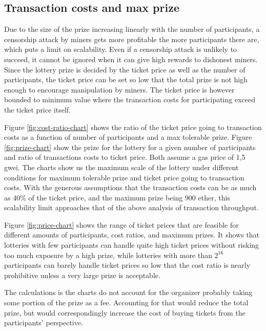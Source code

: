 \subsection{Transaction costs and max prize}

Due to the size of the prize increasing linearly with the number of participants, a censorship attack by miners gets more profitable the more participants there are, which puts a limit on scalability. Even if a censorship attack is unlikely to succeed, it cannot be ignored when it can give high rewards to dishonest miners. Since the lottery prize is decided by the ticket price as well as the number of participants, the ticket price can be set so low that the total prize is not high enough to encourage manipulation by miners. The ticket price is however bounded to minimum value where the transaction costs for participating exceed the ticket price itself.

Figure \ref{fig:cost-ratio-chart} shows the ratio of the ticket price going to transaction costs as a function of number of participants and a max tolerable prize. Figure \ref{fig:prize-chart} show the prize for the lottery for a given number of participants and ratio of transactions costs to ticket price. Both assume a gas price of 1,5 gwei.
The charts show us the maximum scale of the lottery under different conditions for maximum tolerable prize and ticket price going to transaction costs. With the generous assumptions that the transaction costs can be as much as 40\% of the ticket price, and the maximum prize being 900 ether, this scalability limit approaches that of the above analysis of transaction throughput.

Figure \ref{fig:price-chart} shows the range of ticket prices that are feasible for different amounts of participants, cost ratios, and maximum prizes. It shows that lotteries with few participants can handle quite high ticket prices without risking too much exposure by a high prize, while lotteries with more than $2^{16}$ participants can barely handle ticket prices so low that the cost ratio is nearly prohibitive unless a very large prize is acceptable. 

The calculations is the charts do not account for the organizer probably taking some portion of the prize as a fee. Accounting for that would reduce the total prize, but would correspondingly increase the cost of buying tickets from the participants' perspective.


